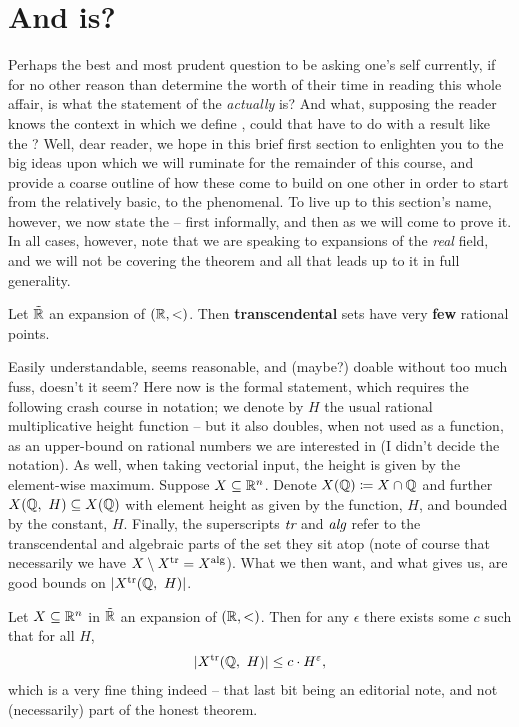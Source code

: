\section{And \pw is?}
\noindent Perhaps the best and most prudent question to be asking one's self currently, if for no other reason than determine the worth of their time in reading this whole affair, is what the statement of the \pwt \emph{actually} is? And what, supposing the reader knows the context in which we define \omy, could that have to do with a \ntc result like the \pwt? Well, dear reader, we hope in this brief first section to enlighten you to the big ideas upon which we will ruminate for the remainder of this course, and provide a coarse outline of how these come to build on one other in order to start from the relatively basic, to the phenomenal. To live up to this section's name, however, we now state the \pwt -- first informally, and then as we will come to prove it. In all cases, however, note that we are speaking to \om expansions of the \emph{real} field, and we will not be covering the theorem and all that leads up to it in full generality.

\begin{theorem}
  \label{thm:pwt_informal}
  Let $\tilde{\mathbb{R}}$ an \om expansion of $(\mathbb{R}, <)$. Then \textbf{transcendental}  sets have very \textbf{few} rational points.
\end{theorem}

Easily understandable, seems reasonable, and (maybe?) doable without too much fuss, doesn't it seem? Here now is the formal statement, which requires the following crash course in notation; we denote by $H$ the usual rational multiplicative height function -- but it also doubles, when not used as a function, as an upper-bound on rational numbers we are interested in (I didn't decide the notation). As well, when taking vectorial input, the height is given by the element-wise maximum. Suppose $X \subseteq \mathbb{R}^n$. Denote $X(\mathbb{Q}) \coloneqq X \cap \mathbb{Q}$ and further $X(\mathbb{Q}, \ H) \subseteq X(\mathbb{Q})$ with element height as given by the function, $H$, and bounded by the constant, $H$. Finally, the superscripts $\emph{tr}$ and $\emph{alg}$ refer to the transcendental and algebraic parts of the set they sit atop (note of course that necessarily we have $X \setminus X^{\textrm{tr}} = X^{\textrm{alg}}$). What we then want, and what \pw gives us, are good bounds on $\vert X^{\textrm{tr}}(\mathbb{Q}, \ H)\vert$.

\begin{theorem}
  \label{thm:pwt_formal}
  Let $X \subseteq \mathbb{R}^n$  in $\tilde{\mathbb{R}}$ an \om expansion of $(\mathbb{R}, <)$. Then for any $\epsilon$ there exists some $c$ such that for all $H$,
  \begin{align*}
    \vert X^{\textrm{tr}}(\mathbb{Q}, \ H)\vert \leq c \cdot H^{\varepsilon},
  \end{align*}
  which is a very fine thing indeed -- that last bit being an editorial note, and not (necessarily) part of the honest theorem.
\end{theorem}

